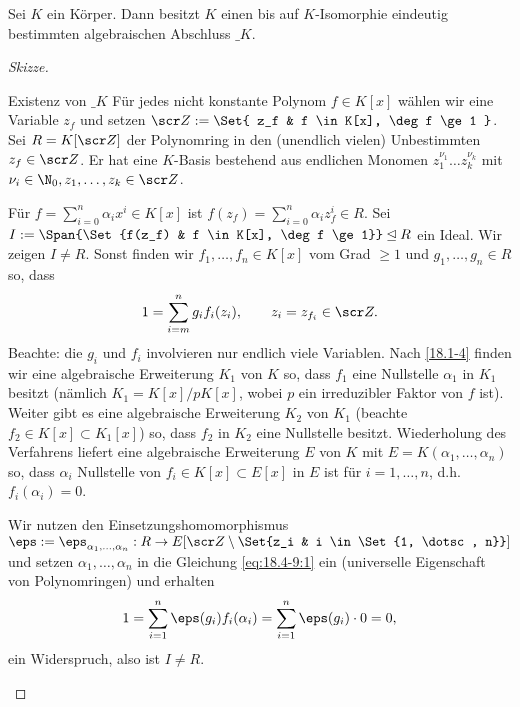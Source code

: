 \begin{st} \label{18.4-9}
	Sei $K$ ein Körper.
	Dann besitzt $K$ einen bis auf $K$-Isomorphie eindeutig bestimmten algebraischen Abschluss $\_K$.
	\begin{proof}[Skizze]
		\begin{seg}{Existenz von $\_K$}
			Für jedes nicht konstante Polynom $f \in K[x]$ wählen wir eine Variable $z_f$ und setzen $\scr Z := \Set{ z_f & f \in K[x], \deg f \ge 1 }$.
			Sei $R = K[\scr Z]$ der Polynomring in den (unendlich vielen) Unbestimmten $z_f \in \scr Z$.
			Er hat eine $K$-Basis bestehend aus endlichen Monomen $z_1^{\nu_1} \dotsc z_k^{\nu_k}$ mit $\nu_i \in \N_0, z_1, \dotsc, z_k \in \scr Z$.

			Für $f = \sum_{i=0}^n \alpha_i x^i \in K[x]$ ist $f(z_f) = \sum_{i=0}^n \alpha_i z_f^i \in R$.
			Sei $I := \Span{\Set{f(z_f) & f \in K[x], \deg f \ge 1}} \IdealOf R$ ein Ideal.
			Wir zeigen $I \neq R$.
			Sonst finden wir $f_1, \dotsc, f_n \in K[x]$ vom Grad $\ge 1$ und $g_1, \dotsc, g_n \in R$ so, dass
			\begin{equation} \label{eq:18.4-9:1}
				1 = \sum_{i=m}^n g_i f_i (z_i),
				\qquad z_i = z_{f_i} \in \scr Z.
			\end{equation}
			Beachte: die $g_i$ und $f_i$ involvieren nur endlich viele Variablen.
			Nach \ref{18.1-4} finden wir eine algebraische Erweiterung $K_1$ von $K$ so, dass $f_1$ eine Nullstelle $\alpha_1$ in $K_1$ besitzt (nämlich $K_1 = K[x] / pK[x]$, wobei $p$ ein irreduzibler Faktor von $f$ ist).
			Weiter gibt es eine algebraische Erweiterung $K_2$ von $K_1$ (beachte $f_2 \in K[x] \subset K_1[x]$) so, dass $f_2$ in $K_2$ eine Nullstelle besitzt.
			Wiederholung des Verfahrens liefert eine algebraische Erweiterung $E$ von $K$ mit $E = K(\alpha_1, \dotsc, \alpha_n)$ so, dass $\alpha_i$ Nullstelle von $f_i \in K[x] \subset E[x]$ in $E$ ist für $i = 1, \dotsc, n$, d.h. $f_i(\alpha_i) = 0$.

			Wir nutzen den Einsetzungshomomorphismus $\eps := \eps_{\alpha_1,\dotsc, \alpha_n} : R \to E[\scr Z \setminus \Set{z_i & i \in \Set{1, \dotsc, n}}]$ und setzen $\alpha_1, \dotsc, \alpha_n$ in die Gleichung \eqref{eq:18.4-9:1} ein (universelle Eigenschaft von Polynomringen) und erhalten
			\[
				1 = \sum_{i=1}^n \eps(g_i) f_i(\alpha_i)
				= \sum_{i=1}^n \eps(g_i) \cdot 0
				= 0,
			\]
			ein Widerspruch, also ist $I \neq R$.


\end{seg}
\end{proof}
\end{st}
